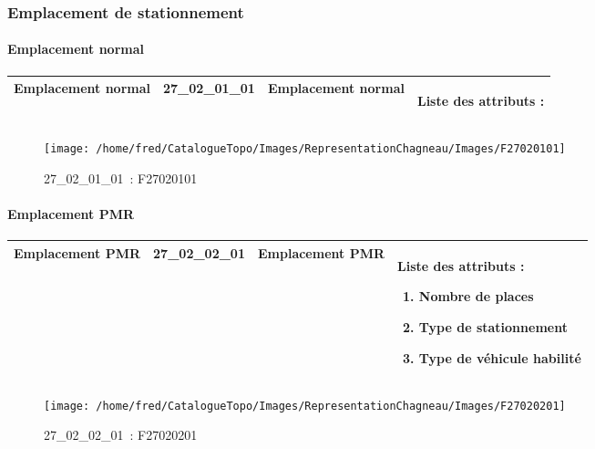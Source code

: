 \documentclass[12pt,titlepage,oneside]{book}
\begin{document}
\subsubsection{\large Emplacement de stationnement}
\paragraph{Emplacement normal}
\noindent
\vspace{\baselineskip}

\renewcommand{\arraystretch}{1.2}
\begin{supertabular}{|p{10cm}|c|p{13cm}|p{12cm}|}
 Emplacement normal & 27\_02\_01\_01 & Emplacement normal & Liste des attributs :
\begin{enumerate}
\end{enumerate}
\\
\hline
\end{supertabular}
\begin{figure}[h!]
  \hfill         %
  \begin{minipage}[t]{3cm}
    \begin{center}
      \texttt{[image: /home/fred/CatalogueTopo/Images/RepresentationChagneau/Images/F27020101]}
      \caption[~27\_02\_01\_01]{\small{27\_02\_01\_01~:} \tiny{F27020101}}\label{F27020101}
    \end{center}
  \end{minipage}
\end{figure}


\paragraph{Emplacement PMR}
\noindent
\vspace{\baselineskip}

\renewcommand{\arraystretch}{1.2}
\begin{supertabular}{|p{10cm}|c|p{13cm}|p{12cm}|}
 Emplacement PMR & 27\_02\_02\_01 & Emplacement PMR & Liste des attributs :
\begin{enumerate}
  \item Nombre de places  \item Type de stationnement  \item Type de véhicule habilité\end{enumerate}
\\
\hline
\end{supertabular}
\begin{figure}[h!]
  \hfill         %
  \begin{minipage}[t]{3cm}
    \begin{center}
      \texttt{[image: /home/fred/CatalogueTopo/Images/RepresentationChagneau/Images/F27020201]}
      \caption[~27\_02\_02\_01]{\small{27\_02\_02\_01~:} \tiny{F27020201}}\label{F27020201}
    \end{center}
  \end{minipage}
\end{figure}
\end{document}

